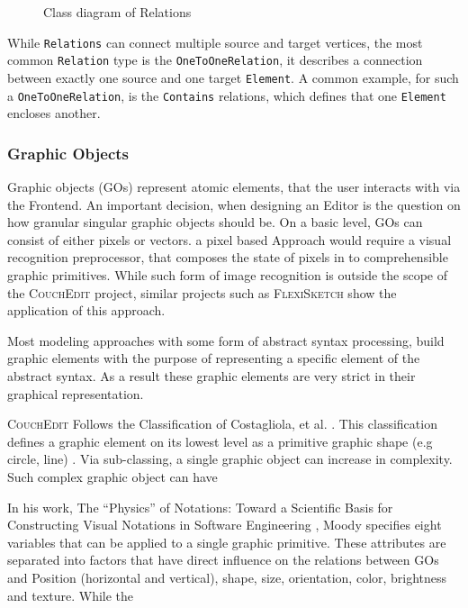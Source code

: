 \begin{figure}[ht]
  \centering
  
  \caption{Class diagram of Relations}
  \label{fig:relations}
\end{figure}

 While \texttt{Relations} can connect multiple source and target vertices, the most common \texttt{Relation} type is the \texttt{OneToOneRelation}, it describes a connection between exactly one source and one target \texttt{Element}. A common example, for such a \texttt{OneToOneRelation}, is the \texttt{Contains} relations, which defines that one \texttt{Element} encloses another.  


\subsubsection{Graphic Objects}

Graphic objects (GOs) represent atomic elements, that the user interacts with via the Frontend. An important decision, when designing an Editor is the question on how granular singular graphic objects should be. On a basic level, GOs can consist of either pixels or vectors. a pixel based Approach would require a visual recognition preprocessor, that composes the state of pixels in to comprehensible graphic primitives. While such form of image recognition is outside the scope of the \textsc{CouchEdit} project, similar projects such as \textsc{FlexiSketch} \cite{wuest_flexisketch_2015} show the application of this approach.

Most modeling approaches with some form of abstract syntax processing, build graphic elements with the purpose of representing a specific element of the abstract syntax. As a result these graphic elements are very strict in their graphical representation.

\textsc{CouchEdit} Follows the Classification of Costagliola, et al. \cite{costagliola_classification_2002}. This classification defines a graphic element on its lowest level as a primitive graphic shape (e.g circle, line) . Via sub-classing, a single graphic object can increase in complexity. Such complex graphic object can have  


In his work, The “Physics” of Notations: Toward a Scientific Basis for Constructing Visual Notations in Software Engineering \cite{moody_physics_2009}, Moody specifies eight variables that can be applied to a single graphic primitive. These attributes are separated into factors that have direct influence on the relations between GOs and   Position
(horizontal and vertical), shape, size, orientation, color, brightness and texture. While the 




